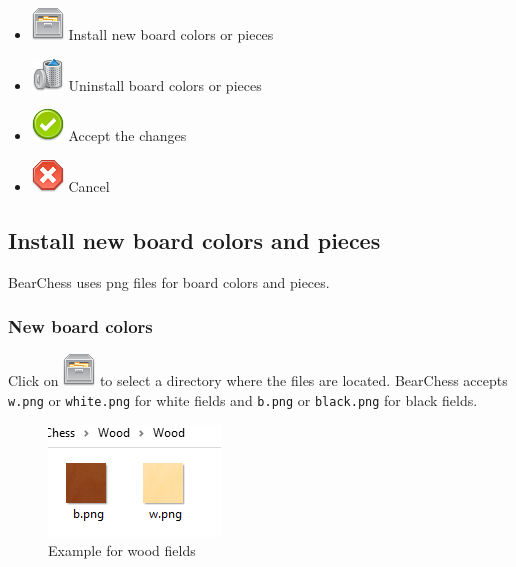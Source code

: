 \documentclass[11pt,a4paper]{article}
\begin{document}
	
	\begin{itemize}
		\item \includegraphics[scale=0.5]{file_manager.png} Install new board colors or pieces
		\item \includegraphics[scale=0.5]{bin.png} Uninstall board colors or pieces
		\item \includegraphics[scale=0.5]{accept_button.png} Accept the changes
		\item \includegraphics[scale=0.5]{cancel.png} Cancel
	\end{itemize}
	
	
	
	
	\subsection{Install new board colors and pieces}
	BearChess uses png files for board colors and pieces.
	
	\subsubsection{New board colors}
	Click on \includegraphics[scale=0.5]{file_manager.png} to select a directory where the files are located. BearChess accepts \verb|w.png| or \verb|white.png| for white fields and \verb|b.png| or \verb|black.png| for black fields.
	
	\begin{figure}[H]
		\centering
		\includegraphics[scale=1.0]{WoodPieces.png}
		\caption{Example for wood fields }
		\label{fig:WoodPieces}
	\end{figure}
	
\end{document}
